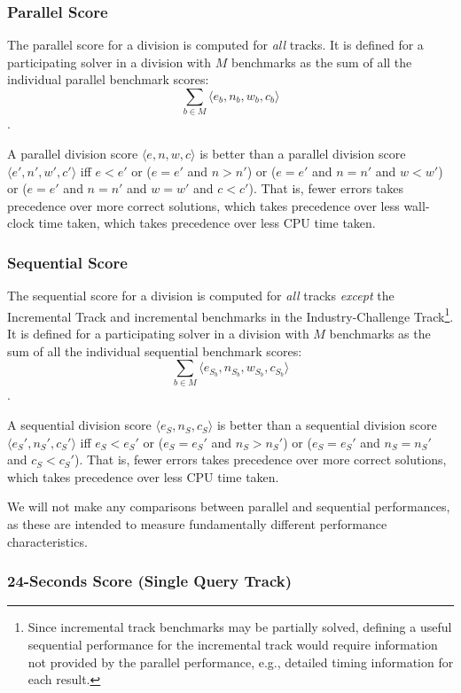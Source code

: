 \documentclass[12pt]{article}
\newcommand{\maintrack}{Single Query Track\xspace}
\newcommand{\inctrack}{Incremental Track\xspace}
\newcommand{\challtrack}{Industry-Challenge Track\xspace}
\begin{document}
\subsubsection{Parallel Score}

The parallel score for a division is computed for \emph{all} tracks.  It is
defined for a participating solver in a division with $M$ benchmarks as the sum
of all the individual parallel benchmark scores:
$$\sum_{b\in M} \langle e_b , n_b , w_b, c_b\rangle$$.

\noindent
A parallel division score $\langle e, n, w, c\rangle$ is better than a parallel
division score $\langle e', n', w', c'\rangle$ iff $e < e'$ or ($e = e'$ and $n
> n'$) or ($e = e'$ and $n = n'$ and $w < w'$) or ($e = e'$ and $n = n'$ and $w
= w'$ and $c < c'$).  That is, fewer errors takes precedence over more correct
solutions, which takes precedence over less wall-clock time taken, which takes
precedence over less CPU time taken.

\subsubsection{Sequential Score}

The sequential score for a division is computed for \emph{all} tracks
\emph{except} the \inctrack and incremental benchmarks in the
\challtrack\footnote{Since incremental track benchmarks may be partially
solved, defining a useful sequential performance for the incremental track
would require information not provided by the parallel performance, e.g.,
detailed timing information for each result.}.  It is defined for a
participating solver in a division with $M$ benchmarks as the sum of all the
individual sequential benchmark scores:
$$\sum_{b\in M} \langle e_{S_b}, n_{S_b}, w_{S_b}, c_{S_b}\rangle$$.

\noindent
A sequential division score $\langle e_S, n_S, c_S\rangle$ is better than a
sequential division score $\langle e_S', n_S', c_S'\rangle$ iff $e_S < e_S'$ or
($e_S = e_S'$ and $n_S > n_S'$) or ($e_S = e_S'$ and $n_S = n_S'$ and $c_S <
c_S'$).  That is, fewer errors takes precedence over more correct solutions,
which takes precedence over less CPU time taken.

We will not make any comparisons between parallel and sequential performances,
as these are intended to measure fundamentally different performance
characteristics.

\subsubsection{24-Seconds Score (\maintrack)}
\end{document}
